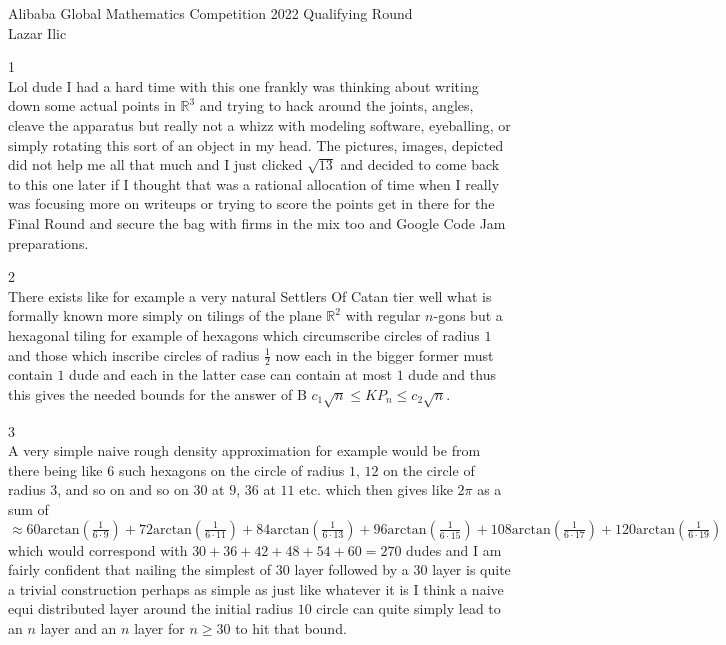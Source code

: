 \Large
Alibaba Global Mathematics Competition 2022 Qualifying Round \\
Lazar Ilic

1 \\
Lol dude I had a hard time with this one frankly was thinking about writing down some actual points in $\mathbb{R}^3$ and trying to hack around the joints, angles, cleave the apparatus but really not a whizz with modeling software, eyeballing, or simply rotating this sort of an object in my head. The pictures, images, depicted did not help me all that much and I just clicked $\sqrt{13}$ and decided to come back to this one later if I thought that was a rational allocation of time when I really was focusing more on writeups or trying to score the points get in there for the Final Round and secure the bag with firms in the mix too and Google Code Jam preparations.


2 \\
There exists like for example a very natural Settlers Of Catan tier well what is formally known more simply on tilings of the plane $\mathbb{R}^2$ with regular $n$-gons but a hexagonal tiling for example of hexagons which circumscribe circles of radius $1$ and those which inscribe circles of radius $\frac{1}{2}$ now each in the bigger former must contain $1$ dude and each in the latter case can contain at most $1$ dude and thus this gives the needed bounds for the answer of B $c_1 \sqrt{n} \le KP_n \le c_2 \sqrt{n}$.

3 \\
A very simple naive rough density approximation for example would be from there being like $6$ such hexagons on the circle of radius $1$, $12$ on the circle of radius $3$, and so on and so on $30$ at $9$, $36$ at $11$ etc. which then gives like $2 \pi$ as a sum of $\approx 60 \text{arctan} \left( \frac{1}{6 \cdot 9} \right) + 72 \text{arctan} \left( \frac{1}{6 \cdot 11} \right) + 84 \text{arctan} \left( \frac{1}{6 \cdot 13} \right) + 96 \text{arctan} \left( \frac{1}{6 \cdot 15} \right) + 108 \text{arctan} \left( \frac{1}{6 \cdot 17} \right) + 120 \text{arctan} \left( \frac{1}{6 \cdot 19} \right)$ which would correspond with $30+36+42+48+54+60 = 270$ dudes and I am fairly confident that nailing the simplest of $30$ layer followed by a $30$ layer is quite a trivial construction perhaps as simple as just like whatever it is I think a naive equi distributed layer around the initial radius $10$ circle can quite simply lead to an $n$ layer and an $n$ layer for $n \ge 30$ to hit that bound.

